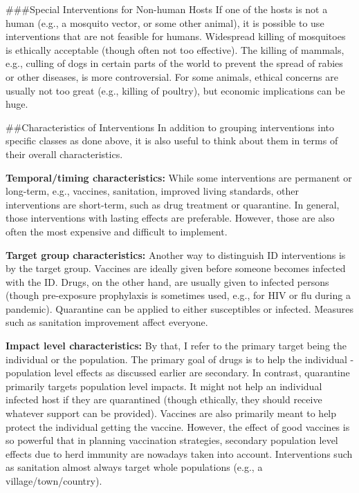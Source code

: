 \documentclass[]{book}
\theoremstyle{definition}
\theoremstyle{definition}
\theoremstyle{definition}
\theoremstyle{remark}
\begin{document}
\#\#\#Special Interventions for Non-human Hosts If one of the hosts is
not a human (e.g., a mosquito vector, or some other animal), it is
possible to use interventions that are not feasible for humans.
Widespread killing of mosquitoes is ethically acceptable (though often
not too effective). The killing of mammals, e.g., culling of dogs in
certain parts of the world to prevent the spread of rabies or other
diseases, is more controversial. For some animals, ethical concerns are
usually not too great (e.g., killing of poultry), but economic
implications can be huge.

\#\#Characteristics of Interventions In addition to grouping
interventions into specific classes as done above, it is also useful to
think about them in terms of their overall characteristics.

\textbf{Temporal/timing characteristics:} While some interventions are
permanent or long-term, e.g., vaccines, sanitation, improved living
standards, other interventions are short-term, such as drug treatment or
quarantine. In general, those interventions with lasting effects are
preferable. However, those are also often the most expensive and
difficult to implement.

\textbf{Target group characteristics:} Another way to distinguish ID
interventions is by the target group. Vaccines are ideally given before
someone becomes infected with the ID. Drugs, on the other hand, are
usually given to infected persons (though pre-exposure prophylaxis is
sometimes used, e.g., for HIV or flu during a pandemic). Quarantine can
be applied to either susceptibles or infected. Measures such as
sanitation improvement affect everyone.

\textbf{Impact level characteristics:} By that, I refer to the primary
target being the individual or the population. The primary goal of drugs
is to help the individual - population level effects as discussed
earlier are secondary. In contrast, quarantine primarily targets
population level impacts. It might not help an individual infected host
if they are quarantined (though ethically, they should receive whatever
support can be provided). Vaccines are also primarily meant to help
protect the individual getting the vaccine. However, the effect of good
vaccines is so powerful that in planning vaccination strategies,
secondary population level effects due to herd immunity are nowadays
taken into account. Interventions such as sanitation almost always
target whole populations (e.g., a village/town/country).
\end{document}

